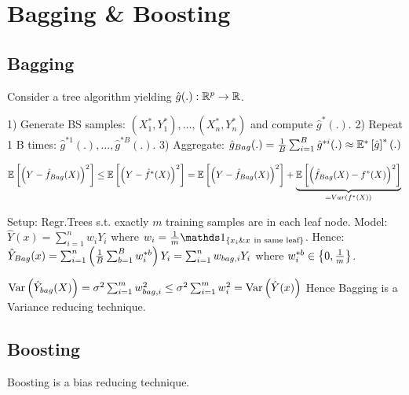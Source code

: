 \section{Bagging \& Boosting}

\vspace{-5pt}

\subsection{Bagging}
Consider a tree algorithm yielding $\hat{g}(.): \mathbb{R}^p \rightarrow \mathbb{R}$.

\vspace{5pt}

 1) Generate BS samples: $(X_1^*,Y_1^*),\dots,(X_n^*,Y_n^*)$ and compute $\hat{g}^* (.)$. 2) Repeat 1 B times: $\hat{g}^{*1} (.), \dots, \hat{g}^{*B} (.)$. 3) Aggregate: $\hat{g}_{Bag} (.) = \frac{1}{B}\sum_{i=1}^B \hat{g}^{*i} (.) \approx \mathbb{E}^* \left[ \hat{g} \right]^*(.)$

\vspace{5pt}

 $\mathbb{E} \left[ \left( Y-\hat{f}_{Bag}(X) \right)^2 \right] \leq \mathbb{E} \left[ \left( Y-\hat{f}^* (X) \right)^2 \right] = \mathbb{E} \left[ \left( Y-\hat{f}_{Bag}(X) \right)^2 \right] + \underbrace{\mathbb{E} \left[ \left( \hat{f}_{Bag} (X) - f^* (X) \right)^2 \right]}_{=Var(f^* (X))}$

\vspace{5pt}

Setup: Regr.Trees s.t. exactly $m$ training samples are in each leaf node. Model: $\hat{Y}(x) = \sum_{i=1}^n w_i Y_i$ where $w_i = \frac{1}{m} \id_{\geschwungeneklammer{x_i \& x \ \text{in same leaf}}}$. Hence: $\hat{Y}_{Bag} (x) = \sum_{i=1}^n \left( \frac{1}{B} \sum_{b=1}^B w_i^{*b} \right) Y_i = \sum_{i=1}^n w_{bag,i} Y_i$ where $w_i^{*b} \in \left\{ 0,\frac{1}{m} \right\}$.

\vspace{5pt}

 $\text{Var} \left( \hat{Y}_{bag} (X) \right) = \sigma^2 \sum_{i=1}^m w_{bag,i}^2 \leq \sigma^2 \sum_{i=1}^m w_i^2 = \text{Var} \left( \hat{Y}(x) \right)$ Hence Bagging is a Variance reducing technique.

\vspace{-5pt}

\subsection{Boosting}
Boosting is a bias reducing technique.

